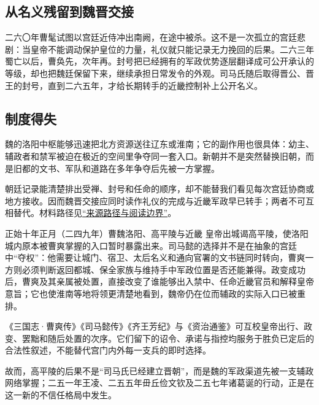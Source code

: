 \subsection{从名义残留到魏晋交接}

二六〇年曹髦试图以宫廷近侍冲出南阙，在途中被杀。这不是一次孤立的宫廷悲剧：当皇帝不能调动保护皇位的力量，礼仪就只能记录无力挽回的后果。二六三年蜀亡以后，曹奂先，次年再。封号把已经拥有的军政优势逐层翻译成可公开承认的等级，却也把魏廷保留下来，继续承担日常发令的外观。司马氏随后取得晋公、晋王的封号，直到二六五年，才给长期转手的近畿控制补上公开名义。

\subsection{制度得失}

魏的洛阳中枢能够迅速把北方资源送往辽东或淮南；它的副作用也很具体：幼主、辅政者和禁军被迫在极近的空间里争夺同一套入口。新朝并不是突然替换旧朝，而是旧都的文书、军队和道路在多年争夺后先被一方掌握。

\begin{sourcenote}[把禅代读成两种速度]
朝廷记录能清楚排出受禅、封号和任命的顺序，却不能替我们看见每次宫廷协商或地方接收。因而魏晋交接应同时读作礼仪的完成与近畿军政早已转手；两者不可互相替代。材料路径见\hyperref[app:sources]{“来源路径与阅读边界”}。
\end{sourcenote}

\begin{event}{}{正始十年正月（二四九年）}{曹魏}{洛阳、高平陵与近畿}
皇帝出城谒高平陵，使洛阳城内原本被曹爽掌握的入口暂时暴露出来。司马懿的选择并不是在抽象的宫廷中“夺权”：他需要让城门、宿卫、太后名义和通向官署的文书链同时转向，曹爽一方则必须判断返回都城、保全家族与维持手中军政位置是否还能兼得。政变成功后，曹爽及其亲属被处置，直接改变了谁能够出入禁中、任命近畿官员和解释皇帝意旨；它也使淮南等地将领更清楚地看到，魏帝仍在位而辅政的实际入口已被重排。

\begin{sourcenote}[高平陵的诏令不是宫门内外的逐时记录]
《三国志·曹爽传》《司马懿传》《齐王芳纪》与《资治通鉴》可互校皇帝出行、政变、罢黜和随后处置的次序。它们留下的诏令、承诺与指控均服务于胜负已定后的合法性叙述，不能替代宫门内外每一支兵的即时选择。
\end{sourcenote}
故而，高平陵的后果不是“司马氏已经建立晋朝”，而是魏的军政渠道先被一支辅政网络掌握；二五一年王凌、二五五年毌丘俭文钦及二五七年诸葛诞的行动，正是在这一新的不信任格局中发生。
\end{event}


